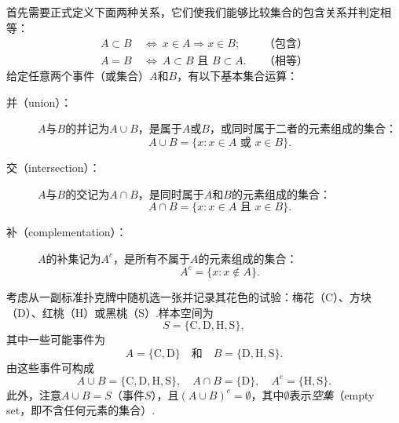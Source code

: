 首先需要正式定义下面两种关系，它们使我们能够比较集合的包含关系并判定相等：
$$\begin{aligned}
A\subset B&\ \Longleftrightarrow\ x\in A\Rightarrow x\in B;&&\text{（包含）}\\
A=B&\ \Longleftrightarrow\ A\subset B\text{ 且 }B\subset A.&&\text{（相等）}
\end{aligned}$$
给定任意两个事件（或集合）$A$和$B$，有以下基本集合运算：
\begin{description}
\item[并（union）：] $A$与$B$的并记为$A\cup B$，是属于$A$或$B$，或同时属于二者的元素组成的集合：
$$A\cup B=\{x:x\in A\text{ 或 }x\in B\}.$$
\item[交（intersection）：] $A$与$B$的交记为$A\cap B$，是同时属于$A$和$B$的元素组成的集合：
$$A\cap B=\{x:x\in A\text{ 且 }x\in B\}.$$
\item[补（complementation）：] $A$的补集记为$A^c$，是所有不属于$A$的元素组成的集合：
$$A^c=\{x:x\notin A\}.$$
\end{description}
\begin{example}[事件运算]\label{ex:1.1.3}
考虑从一副标准扑克牌中随机选一张并记录其花色的试验：梅花（C）、方块（D）、红桃（H）或黑桃（S）.样本空间为
$$S=\{\mathrm C,\mathrm D,\mathrm H,\mathrm S\},$$
其中一些可能事件为
$$A=\{\mathrm C,\mathrm D\}\quad\text{和}\quad B=\{\mathrm D,\mathrm H,\mathrm S\}.$$
由这些事件可构成
$$A\cup B=\{\mathrm C,\mathrm D,\mathrm H,\mathrm S\},\quad A\cap B=\{\mathrm D\},\quad A^c=\{\mathrm H,\mathrm S\}.$$
此外，注意$A\cup B=S$（事件$S$），且$(A\cup B)^c=\emptyset$，其中$\emptyset$表示\emph{空集}（empty set，即不含任何元素的集合）.
\end{example}


